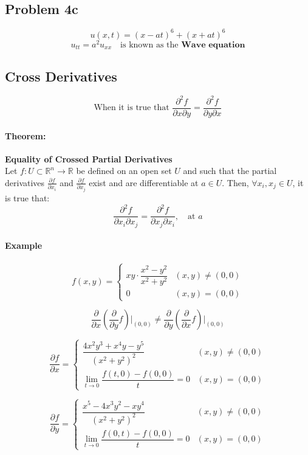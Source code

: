 \documentclass[11pt]{article}
\begin{document}
\subsection*{Problem 4c}
\[
u(x,t) = (x - at)^6 + (x + at)^6
\]
\[
u_{tt} = a^2 u_{xx} \quad \text{is known as the } \textbf{Wave equation}
\]

\subsection{Cross Derivatives}
\[
\text{When it is true that } \frac{\partial^2 f}{\partial x \partial y} = \frac{\partial^2 f}{\partial y \partial x}
\]

\paragraph{Theorem:} \textbf{Equality of Crossed Partial Derivatives} \\
Let $f : U \subset \mathbb{R}^n \rightarrow \mathbb{R}$ be defined on an open set $U$ and such that the partial derivatives $\frac{\partial f}{\partial x_i}$ and $\frac{\partial f}{\partial x_j}$ exist and are differentiable at $a \in U$. Then, $\forall x_i, x_j \in U$, it is true that:
\[
\frac{\partial^2 f}{\partial x_i \partial x_j} = \frac{\partial^2 f}{\partial x_j \partial x_i}, \quad \text{at } a
\]

\paragraph{Example}
\[ f(x,y) = 
\begin{cases}
    xy \cdot \dfrac{x^2 - y^2}{x^2 + y^2} & (x,y) \neq (0,0) \\
    0 & (x,y) = (0,0)
\end{cases}
\]

\[
\frac{\partial}{\partial x} \left(\frac{\partial}{\partial y} f\right) \big|_{(0,0)} \neq \frac{\partial}{\partial y} \left(\frac{\partial}{\partial x} f\right) \big|_{(0,0)}
\]

\[
\frac{\partial f}{\partial x} = 
\begin{cases}
    \dfrac{4x^2y^3 + x^4y - y^5}{(x^2 + y^2)^2} & (x,y) \neq (0,0) \\
    \lim_{t \to 0} \dfrac{f(t,0) - f(0,0)}{t} = 0 & (x,y) = (0,0)
\end{cases}
\]

\[
\frac{\partial f}{\partial y} =
\begin{cases}
    \dfrac{x^5 - 4x^3y^2 - xy^4}{(x^2 + y^2)^2} & (x,y) \neq (0,0) \\
    \lim_{t \to 0} \dfrac{f(0,t) - f(0,0)}{t} = 0 & (x,y) = (0,0)
\end{cases}
\]
\end{document}
